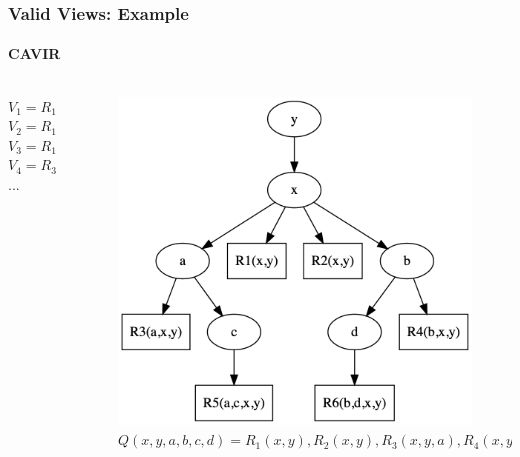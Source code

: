 \documentclass[
	11pt, %
]{beamer}
\begin{document}
\begin{frame}
	\frametitle{Valid Views: Example}
	\framesubtitle{CAVIR}
	\begin{columns}[c] 
		\begin{column}{0.5\textwidth} 
			$V_1= R_1, R_2$ \\
			$V_2= R_1, R_3, R_5$ \\
			$V_3 = R_1, R_2, R_3, R_5$ \\
			$V_4 = R_3, R_5$ \\
			$...$
		\end{column}
		\begin{column}{0.45\textwidth} 
			\begin{figure}
				\includegraphics[height=0.6\textheight]{BigViewEx.png}
				\caption{$Q(x,y,a,b,c,d) = R_1(x,y), R_2(x,y), R_3(x,y,a), R_4(x,y,b), R_5(x,y,a,c),R_6(x,y,b,d)$}
			\end{figure}
		\end{column}
	\end{columns}

\end{frame}
\end{document}
